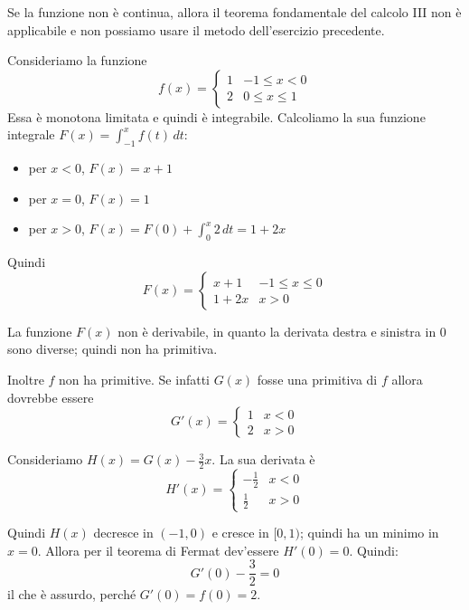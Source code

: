 \begin{remark}
Se la funzione non è continua, allora il teorema fondamentale del calcolo III non è applicabile e non possiamo usare il metodo dell'esercizio precedente.
\end{remark}

\begin{example}
Consideriamo la funzione
\begin{equation*}
f(x) = \begin{cases}
1 & -1 \le x < 0 \\
2 & 0 \le x \le 1
\end{cases}
\end{equation*}
Essa è monotona limitata e quindi è integrabile. Calcoliamo la sua funzione integrale $F(x) = \int_{-1}^x f(t) \, dt$:
\begin{itemize}
\item per $x < 0$, $F(x) = x + 1$
\item per $x = 0$, $F(x) = 1$
\item per $x > 0$, $F(x) = F(0) + \int_0^x 2 \, dt = 1 + 2x$
\end{itemize}
Quindi
\begin{equation*}
F(x) = \begin{cases}
x + 1 & -1 \le x \le 0 \\
1 + 2x & x > 0
\end{cases}
\end{equation*}

La funzione $F(x)$ non è derivabile, in quanto la derivata destra e sinistra in 0 sono diverse; quindi non ha primitiva. 

Inoltre $f$ non ha primitive. Se infatti $G(x)$ fosse una primitiva di $f$ allora dovrebbe essere
\begin{equation*}
G'(x) = \begin{cases}
1 & x < 0 \\
2 & x > 0
\end{cases}
\end{equation*}

Consideriamo $H(x) = G(x) - \frac{3}{2}x$. La sua derivata è
\begin{equation*}
H'(x) = \begin{cases}
-\frac{1}{2} & x < 0 \\
\frac{1}{2} & x > 0
\end{cases}
\end{equation*}

Quindi $H(x)$ decresce in $(-1, 0)$ e cresce in $[0, 1)$; quindi ha un minimo in $x = 0$. Allora per il teorema di Fermat dev'essere $H'(0) = 0$. Quindi:
\begin{equation*}
G'(0) - \frac{3}{2} = 0
\end{equation*}
il che è assurdo, perché $G'(0) = f(0) = 2$.
\end{example}

